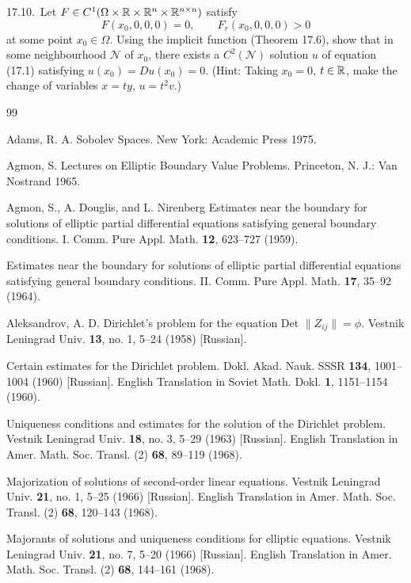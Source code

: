 17.10.\ Let $F \in C^1(\Omega \times \mathbb{R} \times \mathbb{R}^n \times \mathbb{R}^{n \times n})$ satisfy
\[
F(x_0,0,0,0)=0,\qquad F_r(x_0,0,0,0)>0
\]
at some point $x_0 \in \Omega$. Using the implicit function (Theorem 17.6), show that in some neighbourhood $\mathcal N$ of $x_0$, there exists a $C^2(\mathcal N)$ solution $u$ of equation (17.1) satisfying $u(x_0)=Du(x_0)=0$. (Hint: Taking $x_0=0$, $t\in\mathbb{R}$, make the change of variables $x=ty$, $u=t^2v$.)


\begin{thebibliography}{99}

Adams, R. A.
Sobolev Spaces. New York: Academic Press 1975.

Agmon, S.
Lectures on Elliptic Boundary Value Problems. Princeton, N. J.: Van Nostrand 1965.

Agmon, S., A. Douglis, and L. Nirenberg
Estimates near the boundary for solutions of elliptic partial differential equations satisfying
general boundary conditions. I. Comm. Pure Appl. Math. \textbf{12}, 623--727 (1959).

Estimates near the boundary for solutions of elliptic partial differential equations satisfying
general boundary conditions. II. Comm. Pure Appl. Math. \textbf{17}, 35--92 (1964).

Aleksandrov, A. D.
Dirichlet's problem for the equation Det $\|Z_{ij}\| = \phi$. Vestnik Leningrad Univ. \textbf{13}, no. 1,
5--24 (1958) [Russian].

Certain estimates for the Dirichlet problem. Dokl. Akad. Nauk. SSSR \textbf{134}, 1001--1004
(1960) [Russian]. English Translation in Soviet Math. Dokl. \textbf{1}, 1151--1154 (1960).

Uniqueness conditions and estimates for the solution of the Dirichlet problem. Vestnik
Leningrad Univ. \textbf{18}, no. 3, 5--29 (1963) [Russian]. English Translation in Amer. Math.
Soc. Transl. (2) \textbf{68}, 89--119 (1968).

Majorization of solutions of second-order linear equations. Vestnik Leningrad Univ. \textbf{21},
no. 1, 5--25 (1966) [Russian]. English Translation in Amer. Math. Soc. Transl. (2) \textbf{68},
120--143 (1968).

Majorants of solutions and uniqueness conditions for elliptic equations. Vestnik Leningrad
Univ. \textbf{21}, no. 7, 5--20 (1966) [Russian]. English Translation in Amer. Math. Soc. Transl.
(2) \textbf{68}, 144--161 (1968).


\end{thebibliography}
